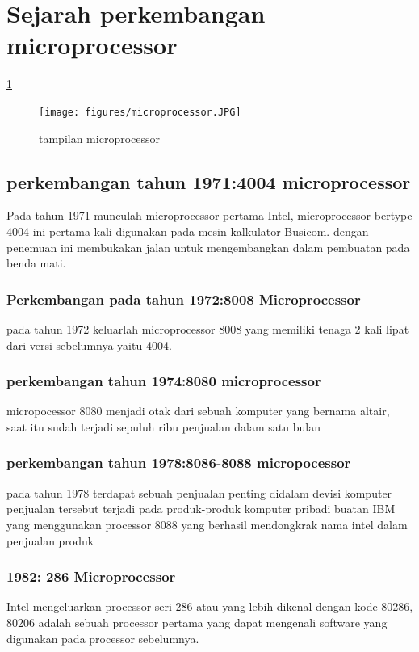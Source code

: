  \section{Sejarah perkembangan microprocessor}
 	\ref{microprocessor}


 	\begin{figure}[ht]
\centerline{\texttt{[image: figures/microprocessor.JPG]}}
\caption{tampilan microprocessor}
\label{microprocessor}
\end{figure}
 			\subsection{perkembangan tahun 1971:4004 microprocessor}
 	Pada tahun 1971 munculah microprocessor pertama Intel, microprocessor bertype 4004 ini pertama kali digunakan pada mesin kalkulator Busicom. dengan penemuan ini membukakan jalan untuk mengembangkan dalam pembuatan pada benda mati.
 			\subsubsection{Perkembangan pada tahun 1972:8008 Microprocessor}
 	pada tahun 1972 keluarlah microprocessor 8008 yang memiliki tenaga 2 kali lipat dari versi sebelumnya yaitu 4004.

 	
 			\subsubsection{perkembangan tahun 1974:8080 microprocessor}
 	micropocessor 8080 menjadi otak dari sebuah komputer yang bernama altair, saat itu sudah terjadi sepuluh ribu penjualan dalam satu bulan
 			\subsubsection{perkembangan tahun 1978:8086-8088 micropocessor}
 	pada tahun 1978 terdapat sebuah penjualan penting didalam devisi komputer penjualan tersebut terjadi pada produk-produk komputer pribadi buatan IBM yang menggunakan processor 8088 yang berhasil mendongkrak nama intel dalam penjualan produk


 			\subsubsection{1982: 286 Microprocessor}
 	Intel mengeluarkan processor seri 286 atau yang lebih dikenal dengan kode 80286, 80206 adalah sebuah processor pertama yang dapat mengenali software yang digunakan pada processor sebelumnya.
